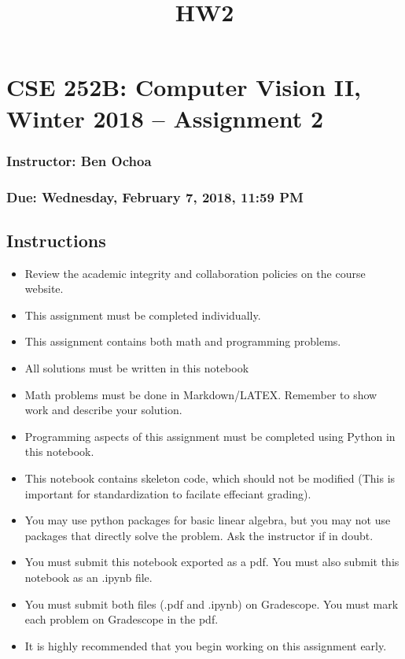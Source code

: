 \documentclass[11pt]{article}
\title{HW2}
\providecommand{\tightlist}{%
      \setlength{\itemsep}{0pt}\setlength{\parskip}{0pt}}
\begin{document}
    
    
    \maketitle
    
    

    
    \hypertarget{cse-252b-computer-vision-ii-winter-2018-assignment-2}{%
\section{CSE 252B: Computer Vision II, Winter 2018 -- Assignment
2}\label{cse-252b-computer-vision-ii-winter-2018-assignment-2}}

\hypertarget{instructor-ben-ochoa}{%
\subsubsection{Instructor: Ben Ochoa}\label{instructor-ben-ochoa}}

\hypertarget{due-wednesday-february-7-2018-1159-pm}{%
\subsubsection{Due: Wednesday, February 7, 2018, 11:59
PM}\label{due-wednesday-february-7-2018-1159-pm}}

    \hypertarget{instructions}{%
\subsection{Instructions}\label{instructions}}

\begin{itemize}
\tightlist
\item
  Review the academic integrity and collaboration policies on the course
  website.
\item
  This assignment must be completed individually.
\item
  This assignment contains both math and programming problems.
\item
  All solutions must be written in this notebook
\item
  Math problems must be done in Markdown/LATEX. Remember to show work
  and describe your solution.
\item
  Programming aspects of this assignment must be completed using Python
  in this notebook.
\item
  This notebook contains skeleton code, which should not be modified
  (This is important for standardization to facilate effeciant grading).
\item
  You may use python packages for basic linear algebra, but you may not
  use packages that directly solve the problem. Ask the instructor if in
  doubt.
\item
  You must submit this notebook exported as a pdf. You must also submit
  this notebook as an .ipynb file.
\item
  You must submit both files (.pdf and .ipynb) on Gradescope. You must
  mark each problem on Gradescope in the pdf.
\item
  It is highly recommended that you begin working on this assignment
  early.
\end{itemize}
\end{document}
